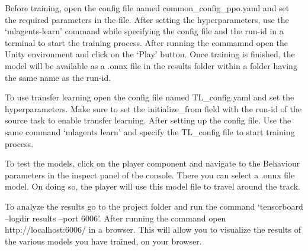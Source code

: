 Before training, open the config file named common\_config\_ppo.yaml and set the required parameters in the file. After setting the hyperparameters, use the `mlagents-learn' command while specifying the config file and the run-id in a terminal to start the training process. After running the commamnd open the Unity environment and click on the `Play' button. Once training is finished, the model will be available as a .onnx file in the results folder within a folder having the same name as the run-id.

To use transfer learning open the config file named TL\_config.yaml and set the hyperparameters. Make sure to set the initialize\_from field with the run-id of the source task to enable transfer learning. After setting up the config file. Use the same command `mlagents learn' and specify the TL\_config file to start training process.

To test the models, click on the player component and navigate to the Behaviour parameters in the inspect panel of the console. There you can select a .onnx file model. On doing so, the player will use this model file to travel around the track.

To analyze the results go to the project folder and run the command `tensorboard --logdir results --port 6006'. After running the command open http://localhost:6006/ in a browser. This will allow you to visualize the results of the various models you have trained, on your browser. 




